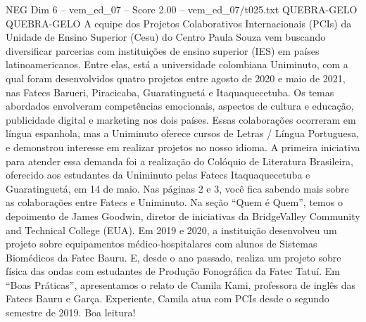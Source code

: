 \begin{textsample}{NEG Dim 6 – vem\_ed\_07 – Score 2.00 – vem\_ed\_07/t025.txt}  \label{ex:f6_neg_059}
QUEBRA-GELO QUEBRA-GELO A equipe dos Projetos Colaborativos Internacionais (PCIs) da Unidade de Ensino Superior (Cesu) do Centro Paula Souza vem buscando diversificar parcerias com instituições de ensino superior (IES) em países latinoamericanos.
Entre elas, está a universidade colombiana Uniminuto, com a qual foram desenvolvidos quatro projetos entre agosto de 2020 e maio de 2021, nas Fatecs Barueri, Piracicaba, Guaratinguetá e Itaquaquecetuba.
Os temas abordados envolveram competências emocionais, aspectos de cultura e educação, publicidade digital e marketing nos dois países.
Essas colaborações ocorreram em língua espanhola, mas a Uniminuto oferece cursos de Letras / Língua Portuguesa, e demonstrou interesse em realizar projetos no nosso idioma.
A primeira iniciativa para atender essa demanda foi a realização do Colóquio de Literatura Brasileira, oferecido aos estudantes da Uniminuto pelas Fatecs Itaquaquecetuba e Guaratinguetá, em 14 de maio.
Nas páginas 2 e 3, você fica sabendo mais sobre as colaborações entre Fatecs e Uniminuto.
Na seção “Quem é Quem”, temos o depoimento de James Goodwin, diretor de iniciativas da BridgeValley Community and Technical College (EUA).
Em 2019 e 2020, a instituição desenvolveu um projeto sobre equipamentos médico-hospitalares com alunos de Sistemas Biomédicos da Fatec Bauru.
E, desde o ano passado, realiza um projeto sobre física das ondas com estudantes de Produção Fonográfica da Fatec Tatuí.
Em “Boas Práticas”, apresentamos o relato de Camila Kami, professora de inglês das Fatecs Bauru e Garça.
Experiente, Camila atua com PCIs desde o segundo semestre de 2019.
Boa leitura!

\end{textsample}
